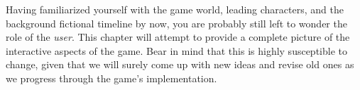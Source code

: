 
Having familiarized yourself with the game world, leading characters, and the background fictional timeline by now, you are probably still left to wonder the role of the {\it user}. This chapter will attempt to provide a complete picture of the interactive aspects of the game. Bear in mind that this is highly susceptible to change, given that we will surely come up with new ideas and revise old ones as we progress through the game's implementation.






\StopChapter

